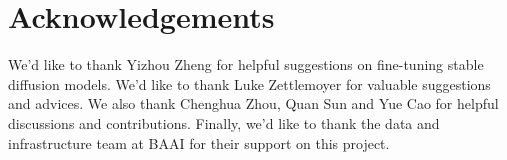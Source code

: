 \section*{Acknowledgements}
We’d like to thank Yizhou Zheng for helpful suggestions on fine-tuning stable diffusion models. We’d like to thank Luke Zettlemoyer for valuable suggestions and advices. We also thank Chenghua Zhou, Quan Sun and Yue Cao for helpful discussions and contributions. Finally, we’d like to thank the data and infrastructure team at BAAI for their support on this project.
